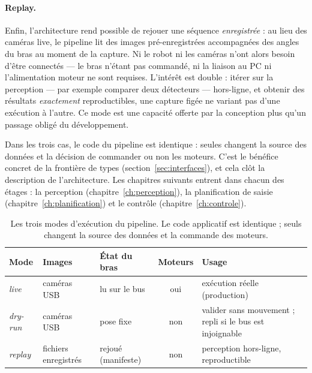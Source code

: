 \paragraph{Replay.} Enfin, l'architecture rend possible de rejouer une séquence \emph{enregistrée} : au lieu des caméras live, le pipeline lit des images pré-enregistrées accompagnées des angles du bras au moment de la capture. Ni le robot ni les caméras n'ont alors besoin d'être connectés --- le bras n'étant pas commandé, ni la liaison au PC ni l'alimentation moteur ne sont requises. L'intérêt est double : itérer sur la perception --- par exemple comparer deux détecteurs --- hors-ligne, et obtenir des résultats \emph{exactement} reproductibles, une capture figée ne variant pas d'une exécution à l'autre. Ce mode est une capacité offerte par la conception plus qu'un passage obligé du développement.

\bigskip

Dans les trois cas, le code du pipeline est identique : seules changent la source des données et la décision de commander ou non les moteurs. C'est le bénéfice concret de la frontière de types (section~\ref{sec:interfaces}), et cela clôt la description de l'architecture. Les chapitres suivants entrent dans chacun des étages : la perception (chapitre~\ref{ch:perception}), la planification de saisie (chapitre~\ref{ch:planification}) et le contrôle (chapitre~\ref{ch:controle}).

\begin{table}[ht]
  \centering\small
  \begin{tabularx}{\linewidth}{l l l c X}
    \toprule
    Mode & Images & État du bras & Moteurs & Usage \\
    \midrule
    \emph{live} & caméras USB & lu sur le bus & oui & exécution réelle (production) \\
    \emph{dry-run} & caméras USB & pose fixe & non & valider sans mouvement ; repli si le bus est injoignable \\
    \emph{replay} & fichiers enregistrés & rejoué (manifeste) & non & perception hors-ligne, reproductible \\
    \bottomrule
  \end{tabularx}
  \caption{Les trois modes d'exécution du pipeline. Le code applicatif est identique ; seuls changent la source des données et la commande des moteurs.}
  \label{tab:modes}
\end{table}
